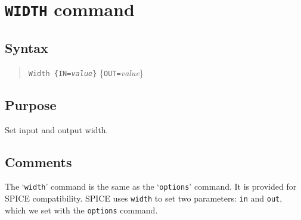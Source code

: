 \section{{\tt WIDTH} command}
\subsection{Syntax}
\begin{verse}
{\tt Width \{{\tt IN=}{\it value}\}} \{{\tt OUT=}{\it value}\}
\end{verse}
\subsection{Purpose}

Set input and output width.
\subsection{Comments}

The `{\tt width}' command is the same as the `{\tt options}'
command.  It is provided for SPICE compatibility.  SPICE uses
{\tt width} to set two parameters: {\tt in} and {\tt out},
which we set with the {\tt options} command.
